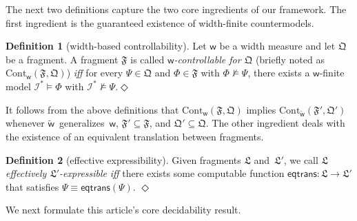 \documentclass[10pt,a4paper]{amsart}
\theoremstyle{definition}
\numberwithin{equation}{section}
\theoremstyle{plain}
\newtheorem{theorem}[theorem]{Theorem}
\theoremstyle{definition}
\newtheorem{definition}[definition]{Definition}
\theoremstyle{myexample}
\theoremstyle{plain}
\theoremstyle{definition}
\newcommand{\instance}{\mathcal{I}}
\newcommand{\fcn}[1]{\mathsf{#1}}
\newcommand{\iffi}{\textit{iff} } %
\newcommand{\defend}{\hfill\ensuremath{\Diamond}}
\begin{document}
\bigskip

The next two definitions capture the two core ingredients of our framework. The first ingredient is the guaranteed existence of width-finite countermodels.

\begin{definition}[width-based controllability]
Let $\fcn{w}$ be a width measure and let $\mathfrak{Q}$ be a fragment.
A fragment $\mathfrak{F}$ is called \emph{$\fcn{w}$-controllable for $\mathfrak{Q}$}  (briefly noted as $\mathrm{Cont}_\fcn{w}(\mathfrak{F},\mathfrak{Q})$) \iffi for every $\Psi \in \mathfrak{Q}$ and  $\Phi \in \mathfrak{F}$ with $\Phi \not \models \Psi$, there exists a $\fcn{w}$-finite model $\instance^* \models \Phi$ with $\instance^* \not\models \Psi$.\defend
\end{definition}


It follows from the above definitions that  $\mathrm{Cont}_\fcn{w}(\mathfrak{F},\mathfrak{Q})$ implies $\mathrm{Cont}_{\widetilde{\fcn{w}}}(\mathfrak{F}'\!,\mathfrak{Q}')$ whenever 
$\widetilde{\fcn{w}}$~generalizes~$\fcn{w}$, $\mathfrak{F}'\! \subseteq \mathfrak{F}$, and $\mathfrak{Q}'\! \subseteq \mathfrak{Q}$.   
%
The other ingredient deals with the existence of an equivalent translation between fragments.

\begin{definition}[effective expressibility]
Given fragments $\mathfrak{L}$ and~$\mathfrak{L}'$, we call $\mathfrak{L}$ \emph{effectively $\mathfrak{L}'$-expressible} \iffi there exists some computable function $\fcn{eqtrans} : \mathfrak{L} \to \mathfrak{L}'$ that satisfies $\Psi \equiv \fcn{eqtrans}(\Psi)$. 
\defend
\end{definition}

We next formulate this article's core decidability result.

\end{document}
